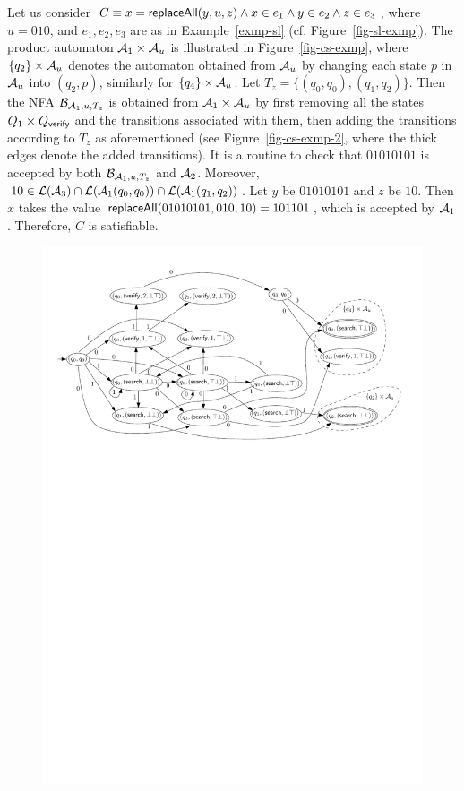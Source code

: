 \begin{example}
Let us consider $C \equiv x = \mathsf{replaceAll}(y, u, z) \wedge x \in e_1 \wedge y \in e_2 \wedge z \in e_3$, where $u = 010$, and $e_1,e_2,e_3$ are as in Example~\ref{exmp-sl} (cf. Figure~\ref{fig-sl-exmp}). The product automaton $\mathcal{A}_1 \times \mathcal{A}_u$ is illustrated in Figure~\ref{fig-cs-exmp}, where $\{q_2\} \times \mathcal{A}_u$ denotes the automaton obtained from $\mathcal{A}_u$ by changing each state $p$ in $\mathcal{A}_u$ into $(q_2, p)$, similarly for $\{q_4\} \times \mathcal{A}_u$. Let $T_z = \{(q_0,q_0),(q_1,q_2)\}$. Then the NFA $\mathcal{B}_{\mathcal{A}_1, u, T_z}$ is obtained from $\mathcal{A}_1 \times \mathcal{A}_u$ by first removing all the states $Q_1 \times Q_{\mathsf{verify}}$ and the transitions associated with them, then adding the transitions according to $T_z$ as aforementioned (see Figure~\ref{fig-cs-exmp-2}, where the thick edges denote the added transitions).  It is a routine to check that $01010101$ is accepted by both $\mathcal{B}_{\mathcal{A}_1, u, T_z}$ and $\mathcal{A}_2$. Moreover, $10 \in \mathcal{L}(\mathcal{A}_3) \cap \mathcal{L}(\mathcal{A}_1(q_0,q_0)) \cap \mathcal{L}(\mathcal{A}_1(q_1,q_2))$. Let $y$ be $01010101$ and $z$ be $10$. Then $x$ takes the value $\mathsf{replaceAll}(01010101, 010, 10)=101101$, which is accepted by $\mathcal{A}_1$. Therefore, $C$ is satisfiable.
\begin{figure}[htbp]
\begin{center}
\includegraphics[scale=0.65]{constant-string-example.pdf}

\end{center}
\end{figure}
\end{example}
